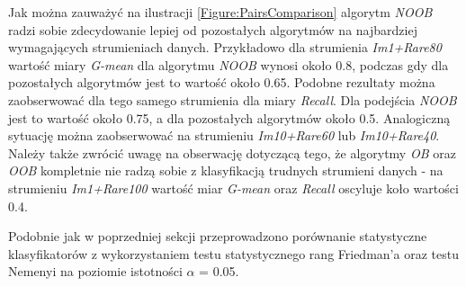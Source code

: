 \noindent Jak można zauważyć na ilustracji \ref{Figure:PairsComparison} algorytm \textit{NOOB} radzi sobie zdecydowanie lepiej od pozostałych algorytmów na najbardziej wymagających strumieniach danych. Przykładowo dla strumienia \textit{Im1+Rare80} wartość miary \textit{G-mean} dla algorytmu \textit{NOOB} wynosi około 0.8, podczas gdy dla pozostałych algorytmów jest to wartość około 0.65. Podobne rezultaty można zaobserwować dla tego samego strumienia dla miary \textit{Recall}. Dla podejścia \textit{NOOB} jest to wartość około 0.75, a dla pozostałych algorytmów około 0.5. Analogiczną sytuację można zaobserwować na strumieniu \textit{Im10+Rare60} lub \textit{Im10+Rare40}. Należy także zwrócić uwagę na obserwację dotyczącą tego, że algorytmy \textit{OB} oraz \textit{OOB} kompletnie nie radzą sobie z klasyfikacją trudnych strumieni danych - na strumieniu \textit{Im1+Rare100} wartość miar \textit{G-mean} oraz \textit{Recall} oscyluje koło wartości 0.4.

Podobnie jak w poprzedniej sekcji przeprowadzono porównanie statystyczne klasyfikatorów z wykorzystaniem testu statystycznego rang Friedman'a oraz testu Nemenyi na poziomie istotności $\alpha$ = 0.05.

\newpage

